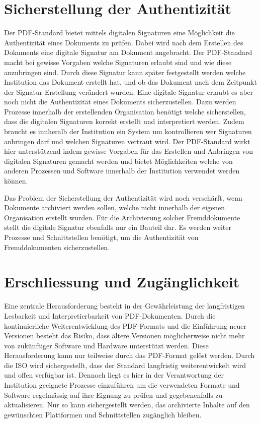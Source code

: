 \documentclass[a4paper,oneside, 12pt]{report}
\begin{document}
\section{Sicherstellung der Authentizität}
Der PDF-Standard bietet mittels digitalen Signaturen eine Möglichkeit die Authentizität eines Dokuments zu prüfen. Dabei wird nach dem Erstellen des Dokuments eine digitale Signatur am Dokument angebracht. Der PDF-Standard macht bei gewisse Vorgaben welche Signaturen erlaubt sind und wie diese anzubringen sind. Durch diese Signatur kann später festgestellt werden welche Institution das Dokument erstellt hat, und ob das Dokument nach dem Zeitpunkt der Signatur Erstellung verändert wurden. Eine digitale Signatur erlaubt es aber noch nicht die Authentizität eines Dokuments sicherzustellen. Dazu werden Prozesse innerhalb der erstellenden Organisation benötigt welche sicherstellen, dass die digitalen Signaturen korrekt erstellt und interpretiert werden. Zudem braucht es innheralb der Institution ein System um kontrollieren wer Signaturen anbringen darf und welchen Signaturen vertraut wird. Der PDF-Standard wirkt hier unterstützend indem gewisse Vorgaben für das Erstellen und Anbringen von digitalen Signaturen gemacht werden und bietet Möglichkeiten welche von anderen Prozessen und Software innerhalb der Institution verwendet werden können.

Das Problem der Sicherstellung der Authentizität wird noch verschärft, wenn Dokumente archiviert werden sollen, welche nicht innerhalb der eigenen Organisation erstellt wurden. Für die Archivierung solcher Fremddokumente stellt die digitale Signatur ebenfalls nur ein Bauteil dar. Es werden weiter Prozesse und Schnittstellen benötigt, um die Authentizität von Fremddokumenten sicherzustellen.



\section{Erschliessung und Zugänglichkeit}
 Eine zentrale Herausforderung besteht in der Gewährleistung der langfristigen Lesbarkeit und Interpretierbarkeit von \ac{PDF}-Dokumenten. Durch die kontinuierliche Weiterentwicklung des \ac{PDF}-Formats und die Einführung neuer Versionen besteht das Risiko, dass ältere Versionen möglicherweise nicht mehr von zukünftiger Software und Hardware unterstützt werden. Diese Herausforderung kann nur teilweise durch das PDF-Format gelöst werden. Durch die \ac{ISO} wird sichergestellt, dass der Standard langfristig weiterentwickelt wird und offen verfügbar ist. Dennoch liegt es hier in der Verantwortung der Institution geeignete Prozesse einzuführen um die verwendeten Formate und Software regelmässig auf ihre Eignung zu prüfen und gegebenenfalls zu aktualisieren. Nur so kann sichergestellt werden, das archivierte Inhalte auf den gewünschten Plattformen und Schnittstellen zugänglich bleiben. 
\end{document}
